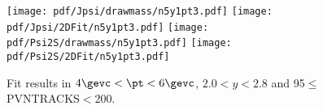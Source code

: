 \begin{figure}[H]
\begin{center}
\texttt{[image: pdf/Jpsi/drawmass/n5y1pt3.pdf]}
\texttt{[image: pdf/Jpsi/2DFit/n5y1pt3.pdf]}
\vspace*{-0.5cm}
\texttt{[image: pdf/Psi2S/drawmass/n5y1pt3.pdf]}
\texttt{[image: pdf/Psi2S/2DFit/n5y1pt3.pdf]}
\vspace*{-0.5cm}
\end{center}
\caption{Fit results in $4\gevc<\pt<6\gevc$, $2.0<y<2.8$ and 95$\leq$PVNTRACKS$<$200.}
\label{Fitn5y1pt3}
\end{figure}
